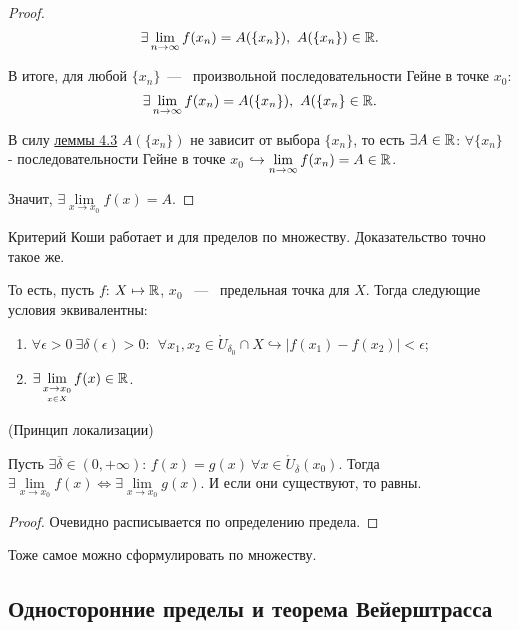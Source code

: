\begin{proof}
    $$
        \exists  \lim\limits_{n\to \infty} f (x_n) = A (\{ x_{n} \}), \ A (\{ x_{n}\}) \in \mathbb{R}.
    $$

    В итоге, для любой $\{ x_n \}$~---~ произвольной последовательности Гейне в точке $x_0$:
    $$
        \exists  \lim\limits_{n\to \infty} f (x_n) = A (\{ x_{n} \}), \ A (\{ x_{n} \} \in \mathbb{R}.
    $$

    В силу \hyperlink{lemm4.3}{леммы 4.3} $A (\{ x_{n} \})$ не зависит от выбора $\{ x_{n} \}$, то есть $\exists A\in \mathbb{R}$: $\forall \{x_n\}$ - последовательности Гейне в точке $x_0$ $ \hookrightarrow \lim\limits_{n\to \infty} f(x_n) = A \in \mathbb{R}$. 
    
    Значит, $\exists \lim\limits_{x\to x_0} f (x) = A. $
\end{proof}

\begin{note}
    Критерий Коши работает и для пределов по множеству. Доказательство точно такое же. 
    
    То есть, пусть $f$: $ X \mapsto \mathbb{R}$, $x_0$ ~---~ предельная точка для $X$. Тогда следующие условия эквивалентны:

   \begin{enumerate}
       \item $\forall \epsilon>0 \ \exists \delta(\epsilon) > 0: \ \ \forall x_1, x_2 \in \mathring{U}_{\delta_0} \cap X \hookrightarrow |f(x_1) - f(x_2)| < \epsilon$;
        \item $\exists \lim\limits_{\underset{x \in X}{x\to x_0}} f (x) \in \mathbb{R}$.
   \end{enumerate}
      
\end{note}

 \begin{theorem}
     \hypertarget{thm4.4}{(Принцип локализации)} Пусть $\exists \overline{\delta} \in (0, +\infty)$: $f(x) = g(x) \ \forall x\in \mathring{U}_{\overline{\delta}} (x_0)$. Тогда 
     $\exists \lim\limits_{x\to x_0} f (x) \Leftrightarrow \exists \lim\limits_{x\to x_0} g (x).$ И если они существуют, то равны.
\end{theorem}
\begin{proof}
    Очевидно расписывается по определению предела.
\end{proof}
\begin{note}
    Тоже самое можно сформулировать по множеству.
\end{note}

\subsection{Односторонние пределы и теорема Вейерштрасса}

